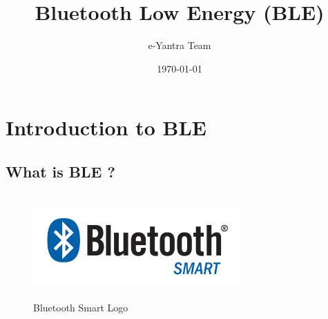 \documentclass[11pt,a4paper]{article}
\begin{document}
\begin{titlepage}
\title{Bluetooth Low Energy (BLE)}
\author{e-Yantra Team}
\date{\today}
\maketitle
\end{titlepage}

    \listoffigures
    \tableofcontents
    \newpage
    
    	\section{ Introduction to BLE}
    	\subsection{What is BLE ?}
    	\begin{figure}[h]
\centering
\includegraphics[width=8cm,height=4cm]{Bluetooth_Smart_Logo.png}
\caption{Bluetooth Smart Logo}
\end{figure}
\end{document}
